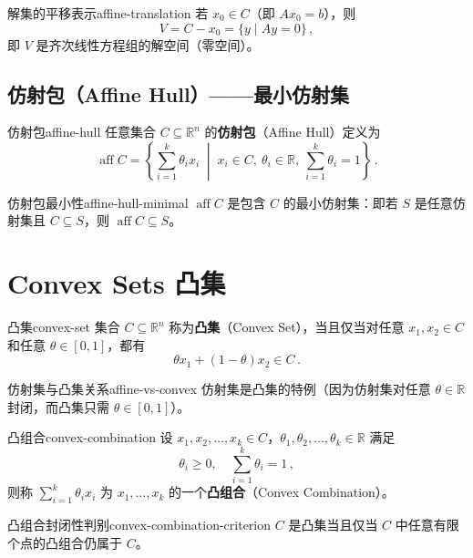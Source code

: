 \documentclass[11pt,a4paper]{article}
\begin{document}
\begin{remark}{解集的平移表示}{affine-translation}
若 $x_0 \in C$（即 $A x_0 = b$），则
\[
V = C - x_0 = \{ y \mid A y = 0 \}\,,
\]
即 $V$ 是齐次线性方程组的解空间（零空间）。
\end{remark}

\subsection{仿射包（Affine Hull）——最小仿射集}
\begin{definition}{仿射包}{affine-hull}
任意集合 $C \subseteq \mathbb{R}^n$ 的\textbf{仿射包}（Affine Hull）定义为
\[
\operatorname{aff} C = \left\{ \sum_{i=1}^k \theta_i x_i \;\middle|\; x_i \in C,\ \theta_i \in \mathbb{R},\ \sum_{i=1}^k \theta_i = 1 \right\}\,.
\]
\end{definition}

\begin{theorem}{仿射包最小性}{affine-hull-minimal}
$\operatorname{aff} C$ 是包含 $C$ 的最小仿射集：即若 $S$ 是任意仿射集且 $C \subseteq S$，则 $\operatorname{aff} C \subseteq S$。
\end{theorem}

\section{Convex Sets 凸集}\label{sec:ch2-convex}

\begin{definition}{凸集}{convex-set}
集合 $C \subseteq \mathbb{R}^n$ 称为\textbf{凸集}（Convex Set），当且仅当对任意 $x_1, x_2 \in C$ 和任意 $\theta \in [0,1]$，都有
\[
\theta x_1 + (1-\theta)x_2 \in C\,.
\]
\end{definition}

\begin{remark}{仿射集与凸集关系}{affine-vs-convex}
仿射集是凸集的特例（因为仿射集对任意 $\theta \in \mathbb{R}$ 封闭，而凸集只需 $\theta \in [0,1]$）。
\end{remark}

\begin{definition}{凸组合}{convex-combination}
设 $x_1, x_2, \dots, x_k \in C$，$\theta_1, \theta_2, \dots, \theta_k \in \mathbb{R}$ 满足
\[
\theta_i \geq 0,\quad \sum_{i=1}^k \theta_i = 1\,,
\]
则称 $\sum_{i=1}^k \theta_i x_i$ 为 $x_1,\dots,x_k$ 的一个\textbf{凸组合}（Convex Combination）。
\end{definition}

\begin{theorem}{凸组合封闭性判别}{convex-combination-criterion}
$C$ 是凸集当且仅当 $C$ 中任意有限个点的凸组合仍属于 $C$。
\end{theorem}
\end{document}
